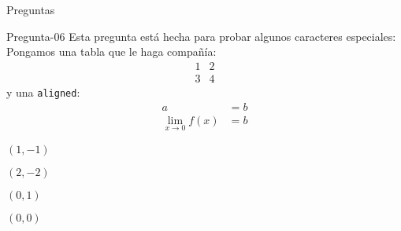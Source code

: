 \documentclass[a4,11pt]{aleph-notas-beta}
\begin{document}
\begin{quiz}{Preguntas}
\begin{multi}[]%
    {Pregunta-06}
    Esta pregunta está hecha para probar algunos caracteres especiales:  Pongamos una tabla que le haga compañía:
    \[
        \begin{array}{c|c}
            1 & 2 \\\hline
            3 & 4
        \end{array}
    \]
    y una \texttt{aligned}:
    \[
        \begin{aligned}
            a & = b\\
            \lim_{x\to0 }f(x) & = b
        \end{aligned}
    \]
    \item $(1,-1)$
    \item $(2,-2)$
    \item $(0,1)$
    \item* $(0,0)$
\end{multi}

\end{quiz}
\end{document}

